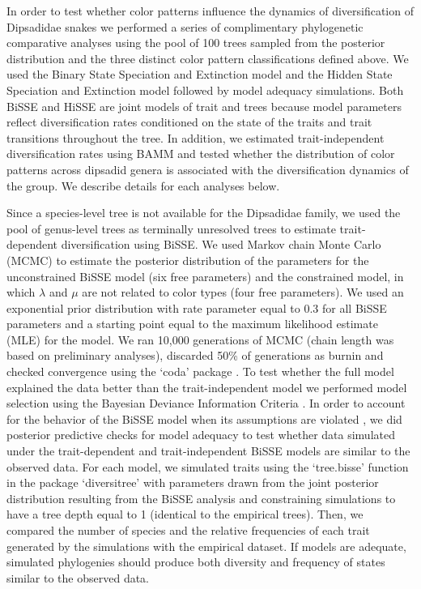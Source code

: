 In order to test whether color patterns influence the dynamics of diversification of Dipsadidae snakes we performed a series of complimentary phylogenetic comparative analyses using the pool of 100 trees sampled from the posterior distribution and the three distinct color pattern classifications defined above. We used the Binary State Speciation and Extinction model \citep[BiSSE –][]{maddison_2007, fitzjohn_estimating_2009, fitzjohn_2012} and the Hidden State Speciation and Extinction model \citep[HiSSE –][]{beaulieu_detecting_2016} followed by model adequacy simulations. Both BiSSE and HiSSE are joint models of trait and trees \citep{beaulieu_detecting_2016} because model parameters reflect diversification rates conditioned on the state of the traits and trait transitions throughout the tree. In addition, we estimated trait-independent diversification rates using BAMM \citep{rabosky_2014} and tested whether the distribution of color patterns across dipsadid genera is associated with the diversification dynamics of the group. We describe details for each analyses below.

Since a species-level tree is not available for the Dipsadidae family, we used the pool of genus-level trees as terminally unresolved trees \citep[\textit{sensu}][]{fitzjohn_estimating_2009} to estimate trait-dependent diversification using BiSSE. We used Markov chain Monte Carlo (MCMC) to estimate the posterior distribution of the parameters for the unconstrained BiSSE model (six free parameters) and the constrained model, in which $\lambda$ and $\mu$ are not related to color types (four free parameters). We used an exponential prior distribution with rate parameter equal to 0.3 for all BiSSE parameters and a starting point equal to the maximum likelihood estimate (MLE) for the model. We ran 10,000 generations of MCMC (chain length was based on preliminary analyses), discarded 50\% of generations as burnin and checked convergence using the `coda' package \citep{plummer_2006}. To test whether the full model explained the data better than the trait-independent model we performed model selection using the Bayesian Deviance Information Criteria \citep[DIC –][]{gelman_understanding_2013}. In order to account for the behavior of the BiSSE model when its assumptions are violated \citep{rabosky_2015, beaulieu_detecting_2016}, we did posterior predictive checks for model adequacy to test whether data simulated under the trait-dependent and trait-independent BiSSE models are similar to the observed data. For each model, we simulated traits using the `tree.bisse' function in the package `diversitree' \citep{fitzjohn_2012} with parameters drawn from the joint posterior distribution resulting from the BiSSE analysis and constraining simulations to have a tree depth equal to 1 (identical to the empirical trees). Then, we compared the number of species and the relative frequencies of each trait generated by the simulations with the empirical dataset. If models are adequate, simulated phylogenies should produce both diversity and frequency of states similar to the observed data.

